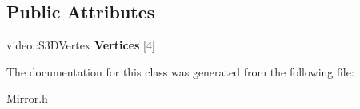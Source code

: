 \subsection*{Public Attributes}
\begin{DoxyCompactItemize}
\item 
\hypertarget{classc_mirror_ab8c5bb7b13a53339baa029e00298c989}{
video::S3DVertex {\bfseries Vertices} \mbox{[}4\mbox{]}}
\label{classc_mirror_ab8c5bb7b13a53339baa029e00298c989}

\end{DoxyCompactItemize}


The documentation for this class was generated from the following file:\begin{DoxyCompactItemize}
\item 
Mirror.h\end{DoxyCompactItemize}
